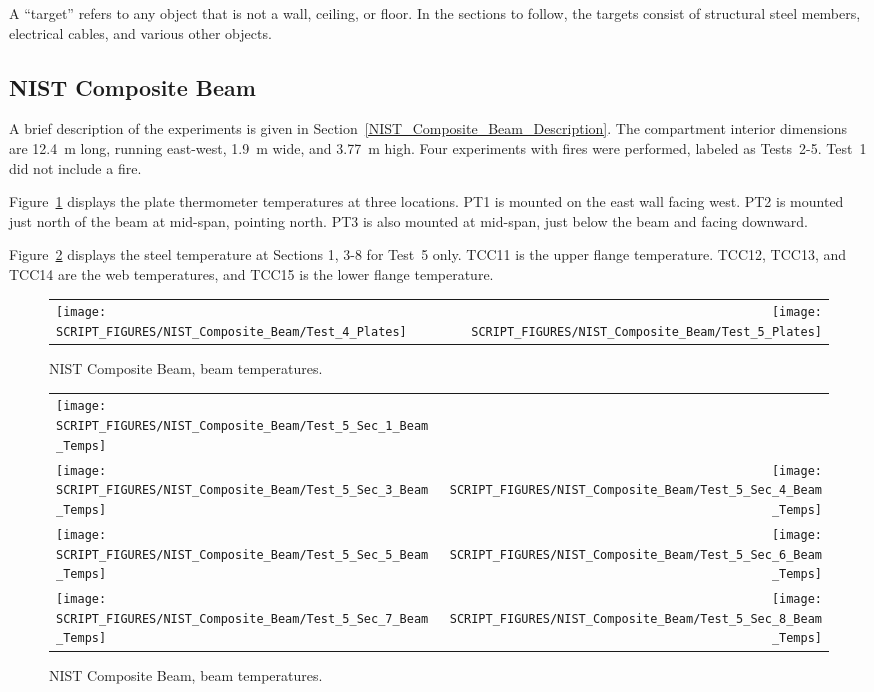 A ``target'' refers to any object that is not a wall, ceiling, or floor. In the sections to follow, the targets consist of structural steel members, electrical cables, and various other objects.


\subsection{NIST Composite Beam}

A brief description of the experiments is given in Section~\ref{NIST_Composite_Beam_Description}. The compartment interior dimensions are 12.4~m long, running east-west, 1.9~m wide, and 3.77~m high. Four experiments with fires were performed, labeled as Tests~2-5. Test~1 did not include a fire.

Figure~\ref{NIST_CB_Plates} displays the plate thermometer temperatures at three locations. PT1 is mounted on the east wall facing west. PT2 is mounted just north of the beam at mid-span, pointing north. PT3 is also mounted at mid-span, just below the beam and facing downward.

Figure~\ref{NIST_CB_Beam} displays the steel temperature at Sections 1, 3-8 for Test~5 only. TCC11 is the upper flange temperature. TCC12, TCC13, and TCC14 are the web temperatures, and TCC15 is the lower flange temperature.

\begin{figure}[!h]
\begin{tabular*}{\textwidth}{l@{\extracolsep{\fill}}r}
\texttt{[image: SCRIPT\_FIGURES/NIST\_Composite\_Beam/Test\_4\_Plates]} &
\texttt{[image: SCRIPT\_FIGURES/NIST\_Composite\_Beam/Test\_5\_Plates]}
\end{tabular*}
\caption[NIST Composite Beam, beam temperatures]{NIST Composite Beam, beam temperatures.}
\label{NIST_CB_Plates}
\end{figure}

\newpage

\begin{figure}[p]
\begin{tabular*}{\textwidth}{l@{\extracolsep{\fill}}r}
\texttt{[image: SCRIPT\_FIGURES/NIST\_Composite\_Beam/Test\_5\_Sec\_1\_Beam\_Temps]} &
 \\
\texttt{[image: SCRIPT\_FIGURES/NIST\_Composite\_Beam/Test\_5\_Sec\_3\_Beam\_Temps]} &
\texttt{[image: SCRIPT\_FIGURES/NIST\_Composite\_Beam/Test\_5\_Sec\_4\_Beam\_Temps]} \\
\texttt{[image: SCRIPT\_FIGURES/NIST\_Composite\_Beam/Test\_5\_Sec\_5\_Beam\_Temps]} &
\texttt{[image: SCRIPT\_FIGURES/NIST\_Composite\_Beam/Test\_5\_Sec\_6\_Beam\_Temps]} \\
\texttt{[image: SCRIPT\_FIGURES/NIST\_Composite\_Beam/Test\_5\_Sec\_7\_Beam\_Temps]} &
\texttt{[image: SCRIPT\_FIGURES/NIST\_Composite\_Beam/Test\_5\_Sec\_8\_Beam\_Temps]}
\end{tabular*}
\caption[NIST Composite Beam, beam temperatures]{NIST Composite Beam, beam temperatures.}
\label{NIST_CB_Beam}
\end{figure}



